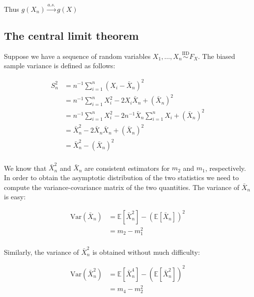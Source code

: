 \documentclass{report}
\begin{document}
Thus $g(X_n) \overset{a.s.}{\to} g(X)$

\subsection{The central limit theorem}

Suppose we have a sequence of random variables $X_1, \dots, X_n \overset{\text{IID}}{\sim} F_X$. The biased sample variance is defined as follows:

\begin{equation}\label{eq:ex-lst-clt-proof-1}
    \begin{aligned}
        S^2_n 
          &= n^{-1} \sum_{i=1}^n \left(X_i - \bar{X}_n\right)^2 \\
          &= n^{-1} \sum_{i=1}^n X_i^2 - 2X_i\bar{X}_n + \left(\bar{X}_n\right)^2 \\
          &= n^{-1} \sum_{i=1}^n X_i^2 - 2n^{-1}\bar{X}_n \sum_{i=1}^n X_i + \left(\bar{X}_n\right)^2 \\
          &= \bar{X}^2_n - 2\bar{X}_n\bar{X}_n + \left(\bar{X}_n\right)^2 \\
          &= \bar{X}^2_n - \left(\bar{X}_n\right)^2 \\
    \end{aligned}
\end{equation}

We know that $\bar{X}^2_n$ and $\bar{X}_n$ are consistent estimators for $m_2$ and $m_1$, respectively. In order to obtain the asymptotic distribution of the two statistics we need to compute the variance-covariance matrix of the two quantities. The variance of $\bar{X}_n$ is easy:

\begin{equation}\label{eq:ex-lst-clt-proof-2}
\begin{aligned}
    \text{Var}\left(\bar{X}_n\right)
      &= \mathbb{E}\left[\bar{X}_n^2\right] - \left(\mathbb{E}\left[\bar{X}_n\right]\right)^2 \\
      &= m_2 - m_1^2 \\
\end{aligned}
\end{equation}

Similarly, the variance of $\bar{X}_n^2$ is obtained without much difficulty:

\begin{equation}\label{eq:ex-lst-clt-proof-3}
    \begin{aligned}
        \text{Var}\left(\bar{X}_n^2\right)
          &= \mathbb{E}\left[\bar{X}_n^4\right] - \left(\mathbb{E}\left[\bar{X}_n^2\right]\right)^2 \\
          &= m_4 - m_2^2 \\
    \end{aligned}
\end{equation}
\end{document}
